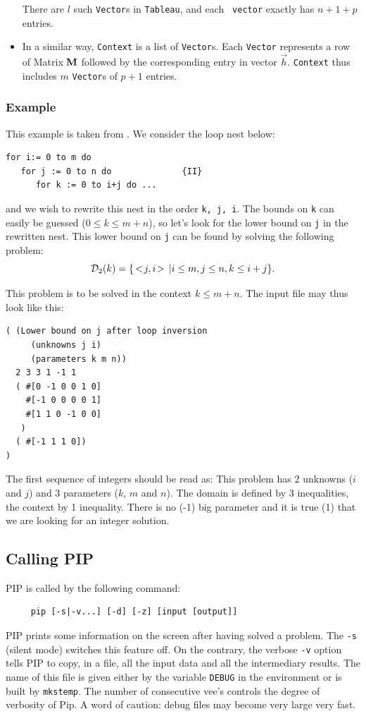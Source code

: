 \documentclass[12pt,a4paper]{article}
\newcommand{\pair}[2]{\,<\!#1,#2\!>\,}
\begin{document}
\begin{itemize}
There are $l$ such {\tt Vector}s in {\tt Tableau}, and each {\tt
vector} exactly has $n+1+p$ entries.


\item In a similar way, {\tt Context} is a list of {\tt Vector}s. Each {\tt Vector} represents a row of Matrix ${\bf M}$ followed by the
corresponding entry in vector $\vec{h}$. {\tt Context} thus includes
$m$ {\tt Vector}s of $p + 1$ entries.

\end{itemize}



\subsubsection{Example} \label{exp2}
This example is taken from \cite{Feau:88c}. We consider the loop nest below:
\begin{verbatim}
for i:= 0 to m do
   for j := 0 to n do              {II}
      for k := 0 to i+j do ...
\end{verbatim}
and we wish to rewrite this nest in the order {\tt k, j, i}. The
bounds on {\tt k} can easily be guessed ($0\leq k \leq m+n$), so let's
look for the lower bound on {\tt j} in the rewritten nest. This lower bound on
{\tt j} can be found by solving the following problem:
\[ {\cal D}_{2}(k) = \{\pair{j}{i} | i \leq m, j \leq n, k \leq i + j\} .\]

This problem is to be solved in the context $k \leq m+n$. The input file
may thus look like this:
\begin{verbatim}
( (Lower bound on j after loop inversion
     (unknowns j i)
     (parameters k m n))
  2 3 3 1 -1 1
  ( #[0 -1 0 0 1 0]
    #[-1 0 0 0 0 1]
    #[1 1 0 -1 0 0]
   )
  ( #[-1 1 1 0])
)
\end{verbatim}
The first sequence of integers should be read as: This problem has 2
unknowns ($i$ and $j$) and 3 parameters ($k$, $m$ and $n$). The domain is
defined by 3 inequalities, the context by 1 inequality. There is no
(-1) big parameter and it is true (1) that we are looking for an
integer solution.

\subsection{Calling PIP}
PIP is called by the following command:
\begin{verbatim}
     pip [-s|-v...] [-d] [-z] [input [output]]
\end{verbatim}
PIP prints some information on the screen after having solved a
problem. The {\tt -s} (silent mode) switches this feature off. On the
contrary, the verbose {\tt -v} option tells PIP to copy, in a file,
all the input data and all the intermediary results. The name of this
file is given either by the variable {\tt DEBUG} in the environment or
is built by {\tt mkstemp}. The number of consecutive vee's controls the
degree of verbosity of Pip. A word of caution: debug files may become
very large very fast.
\end{document}
